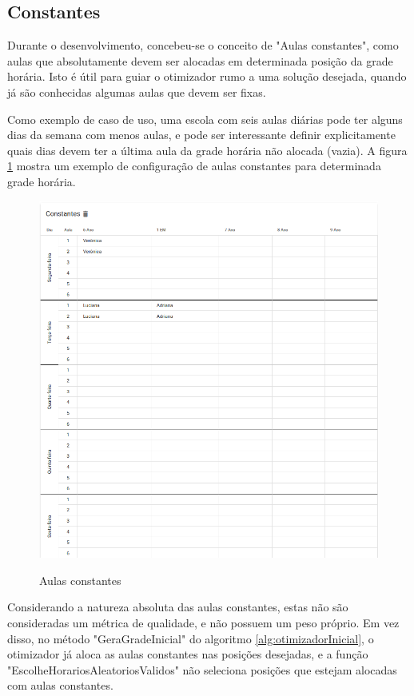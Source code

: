 \subsection{Constantes}

Durante o desenvolvimento, concebeu-se o conceito de "Aulas constantes", como aulas que absolutamente devem ser alocadas em determinada posição da grade horária. Isto é útil para guiar o otimizador rumo a uma solução desejada, quando já são conhecidas algumas aulas que devem ser fixas. 

Como exemplo de caso de uso, uma escola com seis aulas diárias pode ter alguns dias da semana com menos aulas, e pode ser interessante definir explicitamente quais dias devem ter a última aula da grade horária não alocada (vazia). A figura \ref{fig:constantes} mostra um exemplo de configuração de aulas constantes para determinada grade horária.

\begin{figure}[!htb]
	\centering
	\caption{Aulas constantes}
	\includegraphics[width=1\textwidth]{./dados/figuras/constantes}
	\label{fig:constantes}
\end{figure}
\pagebreak

Considerando a natureza absoluta das aulas constantes, estas não são consideradas um métrica de qualidade, e não possuem um peso próprio. Em vez disso, no método "GeraGradeInicial" do algoritmo \ref{alg:otimizadorInicial}, o otimizador já aloca as aulas constantes nas posições desejadas, e a função "EscolheHorariosAleatoriosValidos" não seleciona posições que estejam alocadas com aulas constantes.

